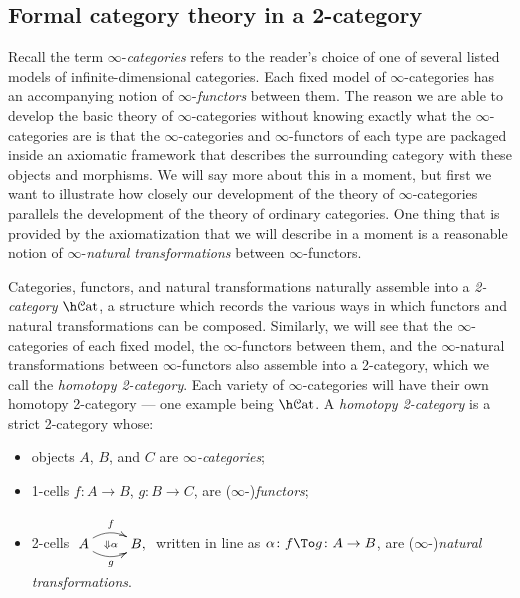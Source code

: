\documentclass[12pt,reqno]{amsart}
\theoremstyle{plain}
\theoremstyle{definition}
\theoremstyle{remark}
\numberwithin{equation}{subsection}
\renewcommand{\Cat}{\mathcal{C}\mathrm{at}}
\begin{document}
\subsection{Formal category theory in a 2-category}

Recall the term $\infty$-\emph{categories} refers to the reader's choice of one of several listed models of infinite-dimensional categories. Each fixed model of $\infty$-categories has an accompanying notion of $\infty$-\emph{functors} between them. The reason we are able to develop the basic theory of $\infty$-categories without knowing exactly what the $\infty$-categories are is that 
the $\infty$-categories and $\infty$-functors of each type are packaged inside an axiomatic framework that describes the surrounding category with these objects and morphisms. We will say more about this in a moment, but first we want to illustrate how closely our development of the theory of $\infty$-categories parallels the development of the theory of ordinary categories.  One thing that is provided by the axiomatization that we will describe in a moment is a reasonable notion of $\infty$-\emph{natural transformations} between $\infty$-functors.

Categories, functors, and natural transformations naturally assemble into a \emph{2-category} $\h\Cat$, a structure which records the various ways in which functors and natural transformations can be composed. Similarly, we will see that the $\infty$-categories of each fixed model, the $\infty$-functors between them, and the $\infty$-natural transformations between $\infty$-functors also assemble into a 2-category, which we call the \emph{homotopy 2-category}. Each variety of $\infty$-categories will have their own homotopy 2-category --- one example being $\h\Cat$. A \emph{homotopy 2-category} is a strict 2-category whose: 
\begin{itemize} 
\item objects $A$, $B$, and $C$ are \emph{$\infty$-categories};
\item 1-cells $f \colon A \to B$, $g \colon B \to C$, are ($\infty$-)\emph{functors};
\item 2-cells $\xymatrix{ A \ar@/^2ex/[r]^f \ar@/_2ex/[r]_g \ar@{}[r]|{\Downarrow\alpha}& B,}$ written in line as $\alpha \colon f \To g \colon A \to B$, are ($\infty$-)\emph{natural transformations}.
\end{itemize}
\end{document}
